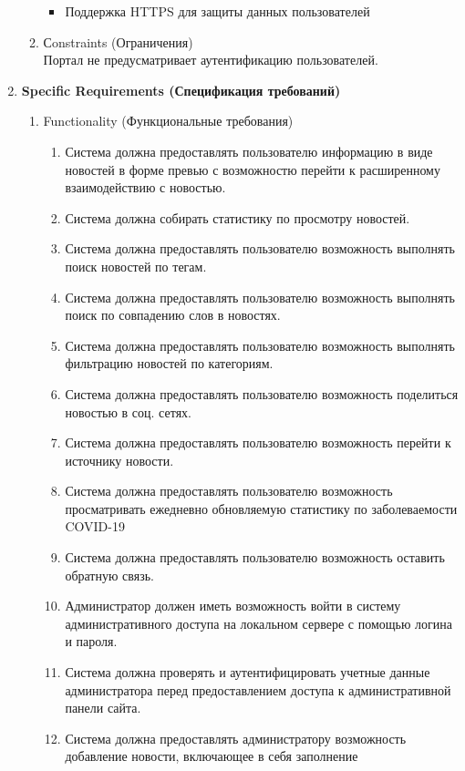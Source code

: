 \begin{enumerate}
\begin{enumerate}[label=2.\arabic*]
\begin{itemize}
            \item Поддержка HTTPS для защиты данных пользователей
        \end{itemize}
        \item Сonstraints (Ограничения) \\
        Портал не предусматривает аутентификацию пользователей.
    \end{enumerate}
    \BgThispage
    \item \textbf{Specific Requirements (Спецификация требований)}
    \begin{enumerate}[label=3.\arabic*]
        \item Functionality (Функциональные требования)
        \begin{enumerate}[label=3.1.\arabic*]
            \item Система должна предоставлять пользователю информацию в виде новостей в форме превью с возможностю перейти к расширенному взаимодействию с новостью.
            \item Система должна собирать статистику по просмотру новостей.
            \item Система должна предоставлять пользователю возможность выполнять поиск новостей по тегам.
            \item Система должна предоставлять пользователю возможность выполнять поиск по совпадению слов в новостях.
            \item Система должна предоставлять пользователю возможность выполнять фильтрацию новостей по категориям.
            \item Система должна предоставлять пользователю возможность поделиться новостью в соц. сетях.
            \item Система должна предоставлять пользователю возможность перейти к источнику новости.
            \item Система должна предоставлять пользователю возможность просматривать ежедневно обновляемую статистику по заболеваемости COVID-19
            \item Система должна предоставлять пользователю возможность оставить обратную связь.
            \item Администратор должен иметь возможность войти в систему административного доступа на локальном сервере с помощью логина и пароля.
            \item Система должна проверять и аутентифицировать учетные данные администратора перед предоставлением доступа к административной панели сайта.
            \item Система должна предоставлять администратору возможность добавление новости, включающее в себя заполнение

\end{enumerate}
\end{enumerate}
\end{enumerate}
